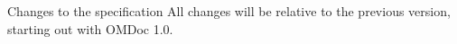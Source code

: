\begin{tchapter}[id=changelog]{Changes to the specification}
All changes will be relative to the previous version, starting out with OMDoc 1.0.




\end{tchapter}



